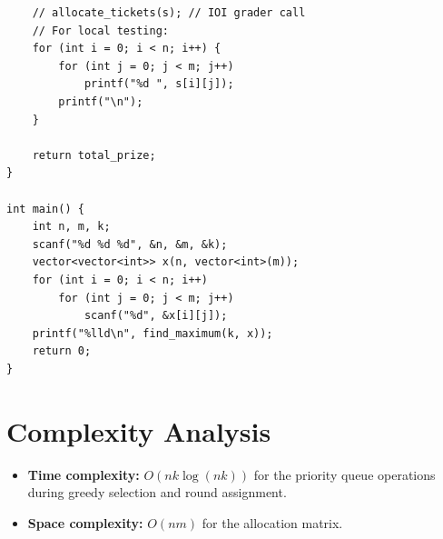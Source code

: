 \documentclass[11pt,a4paper]{article}
\begin{document}
\begin{lstlisting}
    // allocate_tickets(s); // IOI grader call
    // For local testing:
    for (int i = 0; i < n; i++) {
        for (int j = 0; j < m; j++)
            printf("%d ", s[i][j]);
        printf("\n");
    }

    return total_prize;
}

int main() {
    int n, m, k;
    scanf("%d %d %d", &n, &m, &k);
    vector<vector<int>> x(n, vector<int>(m));
    for (int i = 0; i < n; i++)
        for (int j = 0; j < m; j++)
            scanf("%d", &x[i][j]);
    printf("%lld\n", find_maximum(k, x));
    return 0;
}
\end{lstlisting}

\section{Complexity Analysis}
\begin{itemize}
  \item \textbf{Time complexity:} $O(nk \log(nk))$ for the priority queue operations during greedy selection and round assignment.
  \item \textbf{Space complexity:} $O(nm)$ for the allocation matrix.
\end{itemize}
\end{document}
